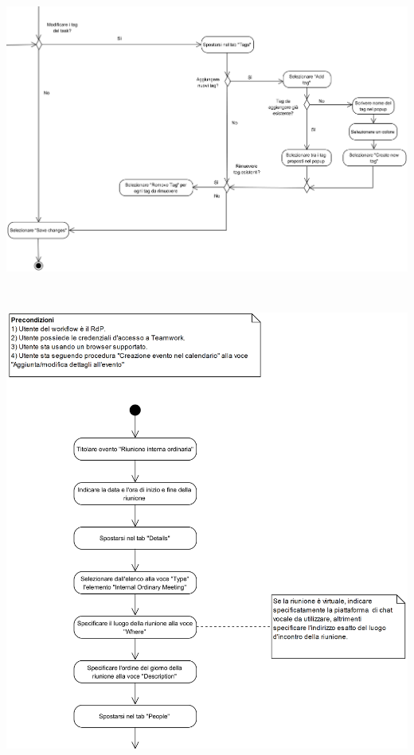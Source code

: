 \begin{center}
	\includegraphics[width=15cm]{./DiagrammiProcedure/EditTask5.png}
\end{center}

\begin{samepage}
	\mbox{}\\
	
	\begin{center}
		\includegraphics[width=15cm]{../../documenti/NormeDiProgetto/DiagrammiProcedure/RiunioneInternaOrdinaria1.png}
	\end{center}
\end{samepage}

